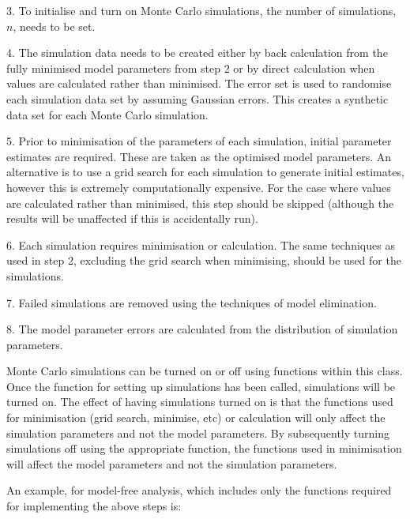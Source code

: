 3.  To initialise and turn on Monte Carlo simulations, the number of simulations, $n$, needs to be set.


4.  The simulation data needs to be created either by back calculation from the fully minimised model parameters from step 2 or by direct calculation when values are calculated rather than minimised.  The error set is used to randomise each simulation data set by assuming Gaussian errors.  This creates a synthetic data set for each Monte Carlo simulation.


5.  Prior to minimisation of the parameters of each simulation, initial parameter estimates are required.  These are taken as the optimised model parameters.  An alternative is to use a grid search for each simulation to generate initial estimates, however this is extremely computationally expensive.  For the case where values are calculated rather than minimised, this step should be skipped (although the results will be unaffected if this is accidentally run).


6.  Each simulation requires minimisation or calculation.  The same techniques as used in step 2, excluding the grid search when minimising, should be used for the simulations.


7.  Failed simulations are removed using the techniques of model elimination.


8.  The model parameter errors are calculated from the distribution of simulation parameters.


Monte Carlo simulations can be turned on or off using functions within this class.  Once the function for setting up simulations has been called, simulations will be turned on.  The effect of having simulations turned on is that the functions used for minimisation (grid search, minimise, etc) or calculation will only affect the simulation parameters and not the model parameters.  By subsequently turning simulations off using the appropriate function, the functions used in minimisation will affect the model parameters and not the simulation parameters.


An example, for model-free analysis, which includes only the functions required for implementing the above steps is:



